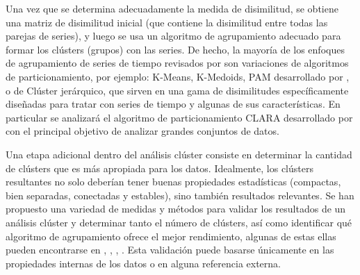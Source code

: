 \documentclass[12pt,oneside]{book}\usepackage[]{graphicx}\usepackage[]{color}
\theoremstyle{definition} %
\begin{document}
Una vez que se determina adecuadamente la medida de disimilitud, se obtiene una matriz de disimilitud inicial (que contiene la disimilitud entre todas las parejas de series), y luego se usa un algoritmo de agrupamiento adecuado para formar los clústers (grupos) con las series. De hecho, la mayoría de los enfoques de agrupamiento de series de tiempo revisados por  \citeauthor{liao2005clustering}  \citeyear{liao2005clustering} son variaciones de algoritmos de particionamiento, por ejemplo: K-Means, K-Medoids, PAM desarrollado por \citeauthor{kaufman1986clustering} \citeyear{kaufman1986clustering}, o de Clúster jerárquico, que sirven en una gama de disimilitudes específicamente diseñadas para tratar con series de tiempo y algunas de sus características. 
En particular se analizará el algoritmo de particionamiento CLARA desarrollado por  \citeauthor{kaufman1990finding} \citeyear{kaufman1990finding} con el principal objetivo de analizar grandes conjuntos de datos.


Una etapa adicional dentro del análisis clúster consiste en determinar la cantidad de clústers que es más apropiada para los datos. Idealmente, los clústers resultantes no solo deberían tener buenas propiedades estadísticas (compactas, bien separadas, conectadas y estables), sino también resultados relevantes. Se han propuesto una variedad de medidas y métodos para validar los resultados de un análisis clúster y determinar tanto el número de clústers, así como identificar qué algoritmo de agrupamiento ofrece el mejor rendimiento, algunas de estas ellas pueden encontrarse en \citeauthor{fraley1998many} \citeyear{fraley1998many}, \citeauthor{duda2001pattern} \citeyear{duda2001pattern}, \citeauthor{kerr2001bootstrapping} \citeyear{kerr2001bootstrapping}, \citeauthor{salvador2004determining} \citeyear{salvador2004determining}. Esta validación puede basarse únicamente en las propiedades internas de los datos o en alguna referencia externa.
\end{document}
